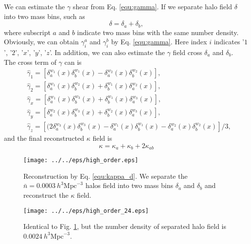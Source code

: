 We can estimate the $\gamma$ shear from Eq. \eqref{equ:gamma}. If we separate
halo field $\delta$ into two mass bins, such as
\begin{equation}
\delta=\delta_a + \delta_b,
\label{equ:h_d}
\end{equation}
where subscript $a$ and $b$ indicate two mass bins with the same number density.
Obviously, we can obtain $\gamma_{i}^{a}$ and $\gamma_{i}^{b}$ by 
Eq. \eqref{equ:gamma}. Here index $i$ indicates 
'$1$', '$2$', '$x$', '$y$', '$z$'.  In addition, 
we can also estimate the $\gamma$ field cross $\delta_{a}$ and $\delta_{b}$.\\
 The cross term of $\gamma$ can is
\begin{equation}
\label{equ:gamma_high}
\begin{split}
&\hat{\gamma}_{1}=\left[\delta^{w_{1}}_{a}(x)\delta^{w_{1}}_{b}(x)-\delta^{w_{2}}_{a}(x)\delta^{w_{2}}_{b}(x) \right],\\
&\hat{\gamma}_{2}=[\delta^{w_{1}}_{a}(x)\delta^{w_{2}}_{b}(x)
+\delta^{w_{1}}_{b}(x)\delta^{w_{2}}_{a}(x)],\\
&\hat{\gamma}_{x}=[\delta^{w_{1}}_{a}(x)\delta^{w_{3}}_{b}(x)
+\delta^{w_{1}}_{b}(x)\delta^{w_{3}}_{a}(x)],\\
&\hat{\gamma}_{y}=[\delta^{w_{2}}_{a}(x)\delta^{w_{3}}_{b}(x)
+\delta^{w_{2}}_{b}(x)\delta^{w_{3}}_{a}(x)],\\
&\hat{\gamma}_{z}=[(2\delta^{w_{3}}_{a}(x)\delta^{w_{3}}_{b}(x)
-\delta^{w_{1}}_{a}(x)\delta^{w_{1}}_{b}(x)
-\delta^{w_{2}}_{a}(x)\delta^{w_{2}}_{b}(x)]/3,
\end{split}
\end{equation}
and the final reconstructed $\kappa$ field is 
\begin{equation}
\kappa=\kappa_{a}+\kappa_{b}+2\kappa_{ab}
\label{equ:kappa_d}
\end{equation}
\begin{figure}[tbp]
\begin{center}
\texttt{[image: ../../eps/high\_order.eps]}
\end{center}
\vspace{-0.7cm}
\caption{Reconstruction by Eq. \eqref{equ:kappa_d}. We separate 
the $\bar{n}=0.0003\ h^{3}\mathrm{Mpc}^{-3}$ halos field into two mass bins $\delta_a$
and $\delta_{b}$ and reconstruct the $\kappa$ field.}
\label{fig:H_CC}
\end{figure}
\begin{figure}[tbp]
\begin{center}
\texttt{[image: ../../eps/high\_order\_24.eps]}
\end{center}
\vspace{-0.7cm}
\caption{Identical to Fig. \ref{fig:H_CC}, but the number density of separated
halo field is $0.0024\ h^{3}\mathrm{Mpc}^{-3}$.}
\label{fig:H_CC_24}
\end{figure}